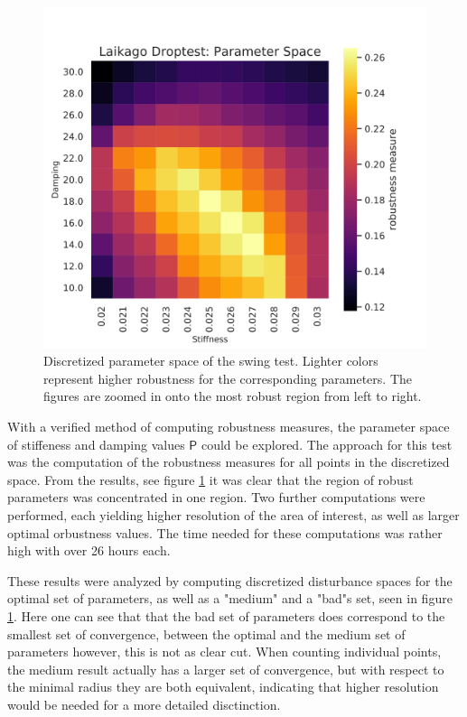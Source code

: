 \begin{figure}[h]
\begin{minipage}{0.33\textwidth}
        \end{minipage}
        \begin{minipage}{0.33\textwidth}
            \centering
            \includegraphics[width=\textwidth]{figures/droptest_ps_zoom2_v2.png} %
        \end{minipage}

    \caption[Discretized Parameter Space, Drop Test]{Discretized parameter space of the swing test. Lighter colors represent higher robustness for the corresponding parameters. The figures are zoomed in onto the most robust region from left to right.}
    \label{fig:dropps}
    \end{figure}

    With a verified method of computing robustness measures, the parameter space of stiffeness and damping values $\mathsf{P}$ could be explored. The approach for this test was the computation of the robustness measures for all points in the  discretized space. From the results, see figure \ref{fig:dropps} it was clear that the region of robust parameters was concentrated in one region. Two further computations were performed, each yielding higher resolution of the area of interest, as well as larger optimal orbustness values. The time needed for these computations was rather high with over 26 hours each. 

    These results were analyzed by computing discretized disturbance spaces for the optimal set of parameters, as well as a "medium" and a "bad"s set, seen in figure \ref{fig:dropps}. Here one can see that that the bad set of parameters does correspond to the smallest set of convergence, between the optimal and the medium set of parameters however, this is not as clear cut. When counting individual points, the medium result actually has a larger set of convergence, but with respect to the minimal radius they are both equivalent, indicating that higher resolution would be needed for a more detailed disctinction. 

